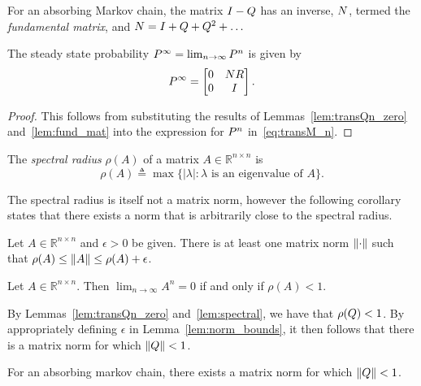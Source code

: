 \begin{myLemma}
	\label{lem:fund_mat}
	For an absorbing Markov chain, the matrix $I - Q$ has an inverse, $N$, termed the \emph{fundamental matrix}, and $N  = I+Q+Q^2 + \ldots$
\end{myLemma}

\begin{myLemma}
	\label{lem:transM_infty}
	The steady state probability $P^{\infty} = \lim_{n \to \infty} P^{n}$ is given by 
	\begin{equation}
	\label{eq:transM_infty}
		P^{\infty} = 
			\begin{bmatrix}
				0 & N R \\ 
				0 & I
			\end{bmatrix}.
	\end{equation}
\end{myLemma}
\begin{proof}
	This follows from substituting the results of Lemmas~\ref{lem:transQn_zero} and~\ref{lem:fund_mat} into the expression for $P^n$ in~\eqref{eq:transM_n}.
\end{proof}

\begin{mydef}
	The \emph{spectral radius} $\rho(A)$ of a matrix $A \in \mathbb{R}^{n \times n}$ is 
	\begin{equation}
		\rho(A) \triangleq \max \{|\lambda| : \lambda \textrm{ is an eigenvalue of } A\}.
	\end{equation}
\end{mydef}

The spectral radius is itself not a matrix norm, however the following corollary states that there exists a norm that is arbitrarily close to the spectral radius.

\begin{myLemma}
	\label{lem:norm_bounds}
	Let $A \in \mathbb{R}^{n \times n}$ and $\epsilon > 0$ be given.  There is at least one matrix norm $\left\lVert\cdot\right\rVert$ such that $\rho(A) \leq \left\lVert A\right\rVert \leq \rho(A) + \epsilon$.
\end{myLemma}

\begin{myLemma}
	\label{lem:spectral}
	Let $A \in \mathbb{R}^{n \times n}$.  Then $\lim_{n \to \infty} A^n = 0$ if and only if $\rho(A) < 1$.
\end{myLemma}

By Lemmas~\ref{lem:transQn_zero} and~\ref{lem:spectral}, we have that $\rho(Q) < 1$.  By appropriately defining $\epsilon$ in Lemma~\ref{lem:norm_bounds}, it then follows that there is a matrix norm for which $\left\lVert Q\right\rVert < 1$.

\begin{mycor}
	\label{cor:transQ_norm}
	For an absorbing markov chain, there exists a matrix norm for which $\left\lVert Q\right\rVert < 1$.
\end{mycor}